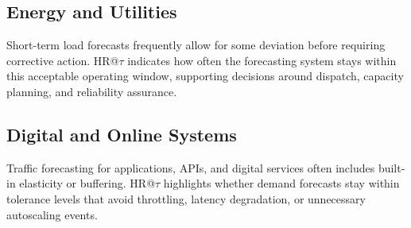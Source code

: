 \subsection{Energy and Utilities}
Short-term load forecasts frequently allow for some deviation before requiring
corrective action. HR@\(\tau\) indicates how often the forecasting system stays
within this acceptable operating window, supporting decisions around dispatch,
capacity planning, and reliability assurance.

\subsection{Digital and Online Systems}
Traffic forecasting for applications, APIs, and digital services often includes
built-in elasticity or buffering. HR@\(\tau\) highlights whether demand forecasts
stay within tolerance levels that avoid throttling, latency degradation, or
unnecessary autoscaling events.
